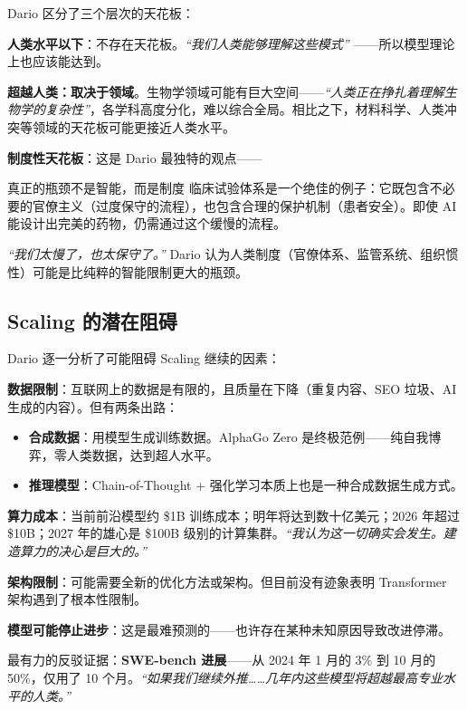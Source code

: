 \documentclass[a4paper]{article}
\begin{document}
Dario 区分了三个层次的天花板：

\textbf{人类水平以下}：不存在天花板。\textit{``我们人类能够理解这些模式''} ——所以模型理论上也应该能达到。

\textbf{超越人类：取决于领域}。生物学领域可能有巨大空间——\textit{``人类正在挣扎着理解生物学的复杂性''}，各学科高度分化，难以综合全局。相比之下，材料科学、人类冲突等领域的天花板可能更接近人类水平。

\textbf{制度性天花板}：这是 Dario 最独特的观点——

\begin{warningbox}{真正的瓶颈不是智能，而是制度}
临床试验体系是一个绝佳的例子：它既包含不必要的官僚主义（过度保守的流程），也包含合理的保护机制（患者安全）。即使 AI 能设计出完美的药物，仍需通过这个缓慢的流程。

\textit{``我们太慢了，也太保守了。''} Dario 认为人类制度（官僚体系、监管系统、组织惯性）可能是比纯粹的智能限制更大的瓶颈。
\end{warningbox}

\subsection{Scaling 的潜在阻碍}

Dario 逐一分析了可能阻碍 Scaling 继续的因素：

\textbf{数据限制}：互联网上的数据是有限的，且质量在下降（重复内容、SEO 垃圾、AI 生成的内容）。但有两条出路：
\begin{itemize}
    \item \textbf{合成数据}：用模型生成训练数据。AlphaGo Zero 是终极范例——纯自我博弈，零人类数据，达到超人水平。
    \item \textbf{推理模型}：Chain-of-Thought + 强化学习本质上也是一种合成数据生成方式。
\end{itemize}

\textbf{算力成本}：当前前沿模型约 \$1B 训练成本；明年将达到数十亿美元；2026 年超过 \$10B；2027 年的雄心是 \$100B 级别的计算集群。\textit{``我认为这一切确实会发生。建造算力的决心是巨大的。''}

\textbf{架构限制}：可能需要全新的优化方法或架构。但目前没有迹象表明 Transformer 架构遇到了根本性限制。

\textbf{模型可能停止进步}：这是最难预测的——也许存在某种未知原因导致改进停滞。

最有力的反驳证据：\textbf{SWE-bench 进展}——从 2024 年 1 月的 3\% 到 10 月的 50\%，仅用了 10 个月。\textit{``如果我们继续外推……几年内这些模型将超越最高专业水平的人类。''}
\end{document}
